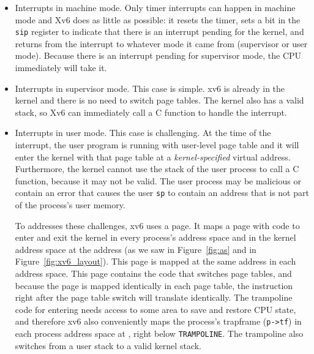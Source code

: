 \begin{itemize}
  
\item Interrupts in machine mode.  Only timer interrupts can happen in
  machine mode and Xv6 does as little as possible: it resets the
  timer, sets a bit in the \lstinline{sip} register to indicate that
  there is an interrupt pending for the kernel, and returns from the
  interrupt to whatever mode it came from (supervisor or user mode).
  Because there is an interrupt pending for supervisor mode, the
  CPU immediately will take it.

\item Interrupts in supervisor mode.  This case is simple. xv6
  is already in the kernel and there is no need to switch page
  tables. The kernel also has a valid stack, so Xv6 can immediately
  call a C function to handle the interrupt.

\item Interrupts in user mode. This case is challenging.  At the time
  of the interrupt, the user program is running with user-level page
  table and it will enter the kernel with that page table at a
  \textit{kernel-specified} virtual address. Furthermore, the kernel
  cannot use the stack of the user process to call a C function,
  because it may not be valid.  The user process may be malicious or
  contain an error that causes the user \texttt{sp} to contain an
  address that is not part of the process's user memory.

  To addresses these challenges, xv6 uses a 
  page.  It maps a page with code to enter and exit the kernel in
  every process's address space and in the kernel address space at the
  address  (as we saw in Figure~\ref{fig:as} and
  in Figure~\ref{fig:xv6_layout}).  This page is mapped at the same
  address in each address space.  This page contains the code that
  switches page tables, and because the page is mapped identically in
  each page table, the instruction right after the page table switch
  will translate identically.  The trampoline code for entering needs
  access to some area to save and restore CPU state, and therefore xv6
  also conveniently maps the process's trapframe (\lstinline{p->tf})
  in each process address space at , right below
  \lstinline{TRAMPOLINE}.  The trampoline also switches from a user
  stack to a valid kernel stack.

\end{itemize}

